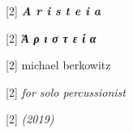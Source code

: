 \documentclass{article}
\newlength{\drop}
\newenvironment{greekpar}           %
    {\greekfont}{}
\begin{document}
    \begin{titlepage}


        \textheight
        \centering

        \hspace{2em}
        \vfill
        {
            \scalebox{1}[2]
            {\fontsize{2.5cm}{1em}\selectfont \textit{\textbf{A r i s t e i a}}}
        }

        \vspace*{1\baselineskip}

        {
            \scalebox{1}[2]
            {\fontsize{1.1cm}{1em}\textit{\textbf{
                \begin{greekpar}
                  Ἀ ρ ι σ τ ε ί α
                \end{greekpar}
              }}}
        }
        \vspace*{.5\baselineskip}


        {
          \begin{center}
            \scalebox{1}[2]
            {\fontsize{.75cm}{1em}\selectfont \hspace{10em} michael \hspace{1pt} berkowitz \hspace{1pt}}
          \end{center}
        }


        \vfill

        {
            \scalebox{1}[2]
            {\fontsize{0.5cm}{1em}\selectfont \itshape for solo percussionist}
        }

        \vspace*{1\baselineskip}

        {
            \scalebox{1}[2]
            {\fontsize{0.5cm}{1em}\selectfont \itshape (2019)}
        }

        \vspace*{2\baselineskip}

    \end{titlepage}
\end{document}
